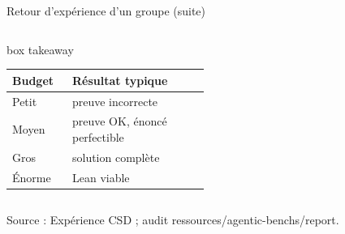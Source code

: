 \documentclass[aspectratio=169]{beamer}
\newenvironment{takeawaybox}{\begin{beamercolorbox}[wd=\linewidth,rounded=true,sep=1.0mm]{box takeaway}}{\end{beamercolorbox}}
\begin{document}
\begin{frame}{Retour d'expérience d'un groupe (suite)}
\begin{columns}[T,onlytextwidth]
\begin{takeawaybox}
\tiny
\renewcommand{\arraystretch}{0.82}
\begin{tabular}{@{}p{0.28\linewidth}p{0.64\linewidth}@{}}
\toprule
Budget & Résultat typique \\
\midrule
\rowcolor{softRed}
Petit & preuve incorrecte \\
\rowcolor{softAmber}
Moyen & preuve OK, énoncé perfectible \\
\rowcolor{softTeal}
Gros & solution complète \\
\rowcolor{softGreen}
Énorme & Lean viable \\
\bottomrule
\end{tabular}
\end{takeawaybox}
\end{columns}
\vspace{-2.0mm}
{\tiny\color{aiSlate}Source : Expérience CSD ; audit ressources/agentic-benchs/report.\par}
\end{frame}
\end{document}
